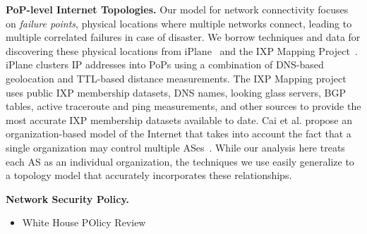 
{\bf PoP-level Internet Topologies.}  Our model for network connectivity
    focuses on {\it failure points}, physical locations where multiple
    networks connect, leading to multiple correlated failures in case of
    disaster.  We borrow techniques and data for discovering these
    physical locations from iPlane~\cite{iplane} and the IXP Mapping
    Project~\cite{ixps-mapped}.  iPlane clusters IP addresses into PoPs
    using a combination of DNS-based geolocation and TTL-based distance
    measurements.  The IXP Mapping project uses public IXP membership
    datasets, DNS names, looking glass servers, BGP tables, active
    traceroute and ping measurements, and other sources to provide the
    most accurate IXP membership datasets available to date. Cai et al.  propose
    an organization-based model of the Internet that takes into account the fact
    that a single organization may control multiple ASes~\cite{as-to-org}. While
    our analysis here treats each AS as an individual organization, the
    techniques we use easily generalize to a topology model that accurately
    incorporates these relationships. 

{\bf Network Security Policy.}
    \begin{itemize}
        \item White House POlicy Review~\cite{cyberspacepolicy} 
    \end{itemize}
